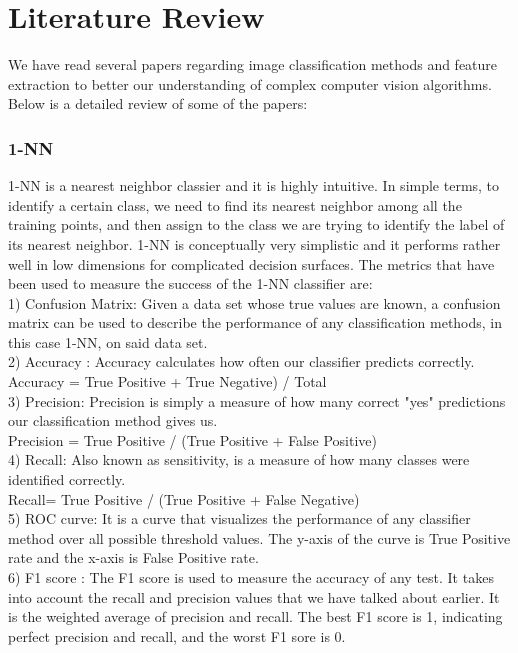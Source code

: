 \documentclass[]{IEEEphot}
\begin{document}
\section{Literature Review}


We have read several papers regarding image classification methods and feature extraction to better our understanding of complex computer vision algorithms. Below is a detailed review of some of the papers: 

\subsubsection{1-NN}
1-NN is a nearest neighbor classier and it is highly intuitive. In simple terms, to identify a certain class, we need to find its nearest neighbor among all the training points, and then assign to the class we are trying to identify the label of its nearest neighbor. 1-NN is conceptually very simplistic and it performs rather well in low dimensions for complicated decision surfaces. 
The metrics that have been used to measure the success of the 1-NN classifier are: 
\\1) Confusion Matrix: Given a data set whose true values are known, a confusion matrix can be used to describe the performance of any classification methods, in this case 1-NN, on said data set.
\\2) Accuracy : Accuracy calculates how often our classifier predicts correctly. 
\\Accuracy = True Positive + True Negative) / Total
\\3) Precision: Precision is simply a measure of how many correct "yes" predictions our classification method gives us.
\\Precision = True Positive / (True Positive + False Positive)
\\4) Recall: Also known as sensitivity, is a measure of how many classes were identified correctly.
\\Recall= True Positive / (True Positive + False Negative)
\\5) ROC curve: It is a curve that visualizes the performance of any classifier method over all possible threshold values. The y-axis of the curve is True Positive rate and the x-axis is False Positive rate.
\\6) F1 score : The F1 score is used to measure the accuracy of any test. It takes into account the recall and precision values that we have talked about earlier. It is the weighted average of precision and recall. The best F1 score is 1, indicating perfect precision and recall, and the worst F1 sore is 0.
\end{document}
